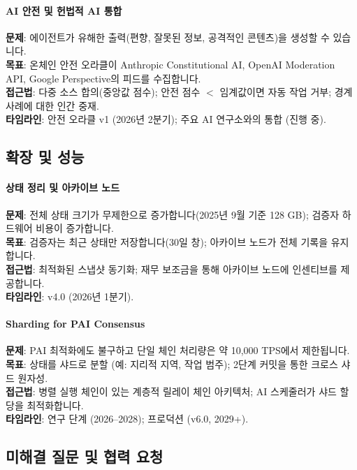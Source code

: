 \documentclass[11pt]{article}
\begin{document}
\paragraph{AI 안전 및 헌법적 AI 통합}
\textbf{문제}: 에이전트가 유해한 출력(편향, 잘못된 정보, 공격적인 콘텐츠)을 생성할 수 있습니다.\\
\textbf{목표}: 온체인 안전 오라클이 Anthropic Constitutional AI, OpenAI Moderation API, Google Perspective의 피드를 수집합니다.\\
\textbf{접근법}: 다중 소스 합의(중앙값 점수); 안전 점수 $<$ 임계값이면 자동 작업 거부; 경계 사례에 대한 인간 중재.\\
\textbf{타임라인}: 안전 오라클 v1 (2026년 2분기); 주요 AI 연구소와의 통합 (진행 중).

\subsection{확장 및 성능}

\paragraph{상태 정리 및 아카이브 노드}
\textbf{문제}: 전체 상태 크기가 무제한으로 증가합니다(2025년 9월 기준 128 GB); 검증자 하드웨어 비용이 증가합니다.\\
\textbf{목표}: 검증자는 최근 상태만 저장합니다(30일 창); 아카이브 노드가 전체 기록을 유지합니다.\\
\textbf{접근법}: 최적화된 스냅샷 동기화; 재무 보조금을 통해 아카이브 노드에 인센티브를 제공합니다.\\
\textbf{타임라인}: v4.0 (2026년 1분기).

\paragraph{Sharding for PAI Consensus}
\textbf{문제}: PAI 최적화에도 불구하고 단일 체인 처리량은 약 10,000 TPS에서 제한됩니다.\\
\textbf{목표}: 상태를 샤드로 분할 (예: 지리적 지역, 작업 범주); 2단계 커밋을 통한 크로스 샤드 원자성.\\
\textbf{접근법}: 병렬 실행 체인이 있는 계층적 릴레이 체인 아키텍처; AI 스케줄러가 샤드 할당을 최적화합니다.\\
\textbf{타임라인}: 연구 단계 (2026--2028); 프로덕션 (v6.0, 2029+).

\subsection{미해결 질문 및 협력 요청}
\end{document}
